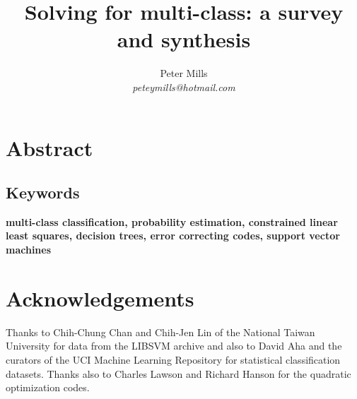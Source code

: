 \documentclass{article}
\begin{document}
\title{Solving for multi-class: a survey and synthesis}

\author{Peter Mills\\\textit{peteymills@hotmail.com}}

\maketitle

\begin{center}
	\setlength{\fboxsep}{0pt}
	\setlength{\fboxrule}{1pt}
\end{center}

\section*{Abstract}



\subsection*{Keywords}
\textbf{multi-class classification,
probability estimation,
constrained linear least squares,
decision trees,
error correcting codes,
support vector machines}

\tableofcontents



\appendix

\section*{Acknowledgements}

Thanks to Chih-Chung Chan and Chih-Jen Lin of the National Taiwan University
for data from the LIBSVM archive and also to David Aha and the curators of
the UCI Machine Learning Repository for statistical classification datasets.
Thanks also to Charles Lawson and Richard Hanson for the quadratic optimization
codes.


%
\end{document}
